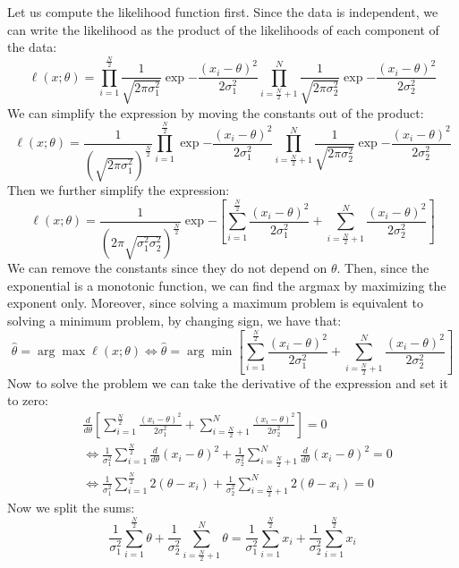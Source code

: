 Let us compute the likelihood function first. Since the data is independent, we can write the likelihood as the product of the likelihoods of each component of the data:
\[
    \ell(x;\theta) = \prod_{i=1}^{\frac{N}{2}} \frac{1}{\sqrt{2\pi\sigma_1^2}} \exp{-\frac{(x_i - \theta)^2}{2\sigma_1^2}} \prod_{i=\frac{N}{2}+1}^{N} \frac{1}{\sqrt{2\pi\sigma_2^2}} \exp{-\frac{(x_i - \theta)^2}{2\sigma_2^2}}
\]
We can simplify the expression by moving the constants out of the product:
\[
    \ell(x;\theta) = \frac{1}{\left(\sqrt{2\pi\sigma_1^2}\right)^{\frac{N}{2}}}  \prod_{i=1}^{\frac{N}{2}} \exp{-\frac{(x_i - \theta)^2}{2\sigma_1^2}} \prod_{i=\frac{N}{2}+1}^{N} \frac{1}{\sqrt{2\pi\sigma_2^2}} \exp{-\frac{(x_i - \theta)^2}{2\sigma_2^2}}
\]
Then we further simplify the expression:
\[
    \ell(x;\theta) = \frac{1}{\left(2\pi\sqrt{\sigma_1^2\sigma_2^2}\right)^{\frac{N}{2}}} \exp{ - \left[\sum_{i=1}^{\frac{N}{2}} \frac{(x_i - \theta)^2}{2\sigma_1^2} + \sum_{i=\frac{N}{2} + 1}^{N} \frac{(x_i - \theta)^2}{2\sigma_2^2}\right]}
\]
We can remove the constants since they do not depend on $\theta$. Then, since the exponential is a monotonic function, we can find the argmax by maximizing the exponent only. Moreover, since solving a maximum problem is equivalent to solving a minimum problem, by changing sign, we have that:
\[
    \hat{\theta} = \arg\max \ell(x; \theta) \iff \hat{\theta} = \arg\min \left[\sum_{i=1}^{\frac{N}{2}} \frac{(x_i - \theta)^2}{2\sigma_1^2} + \sum_{i=\frac{N}{2} + 1}^{N} \frac{(x_i - \theta)^2}{2\sigma_2^2}\right]
\]
Now to solve the problem we can take the derivative of the expression and set it to zero:
\begin{align*}
     & \frac{d}{d\theta} \left[\sum_{i=1}^{\frac{N}{2}} \frac{(x_i - \theta)^2}{2\sigma_1^2} + \sum_{i=\frac{N}{2} + 1}^{N} \frac{(x_i - \theta)^2}{2\sigma_2^2}\right] = 0                      \\
     & \Leftrightarrow \frac{1}{\sigma_1^2} \sum_{i=1}^{\frac{N}{2}} \frac{d}{d\theta}(x_i - \theta)^2 + \frac{1}{\sigma_2^2} \sum_{i=\frac{N}{2} + 1}^{N} \frac{d}{d\theta}(x_i - \theta)^2 = 0 \\
     & \Leftrightarrow \frac{1}{\sigma_1^2} \sum_{i=1}^{\frac{N}{2}} 2(\theta -x_i) + \frac{1}{\sigma_2^2} \sum_{i=\frac{N}{2} + 1}^{N} 2(\theta - x_i) = 0
\end{align*}
Now we split the sums:
\[
    \frac{1}{\sigma_1^2} \sum_{i=1}^{\frac{N}{2}} \theta + \frac{1}{\sigma_2^2} \sum_{i=\frac{N}{2} + 1}^{N} \theta = \frac{1}{\sigma_1^2} \sum_{i=1}^{\frac{N}{2}} x_i + \frac{1}{\sigma_2^2} \sum_{i=1}^{\frac{N}{2}} x_i
\]
